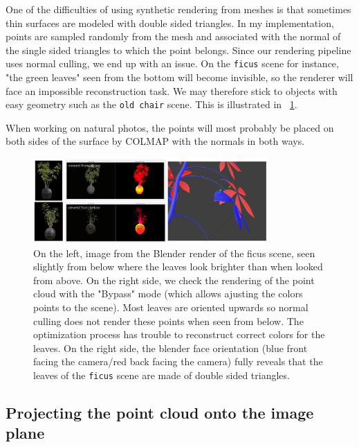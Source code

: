 \noindent One of the difficulties of using synthetic rendering from meshes is that sometimes thin surfaces are modeled with double sided triangles. In my implementation, points are sampled randomly from the mesh and associated with the normal of the single sided triangles to which the point belongs. Since our rendering pipeline uses normal culling, we end up with an issue. On the \texttt{ficus} scene for instance, "the green leaves" seen from the bottom will become invisible, so the renderer will face an impossible reconstruction task. We may therefore stick to objects with easy geometry such as the \texttt{old chair} scene. This is illustrated in ~\cref{fig:ficus_culling_issue}.

\noindent When working on natural photos, the points will most probably be placed on both sides of the surface by COLMAP with the normals in both ways. 


\begin{figure}
    \centering
    \includegraphics[width=0.8\textwidth]{figures/double_sided_surfaces_issues.png}
    \caption{On the left, image from the Blender render of the ficus scene, seen slightly from below where the leaves look brighter than when looked from above. On the right side, we check the rendering of the point cloud with the "Bypass" mode (which allows ajusting the colors points to the scene). Most leaves are oriented upwards so normal culling does not render these points when seen from below. The optimization process has trouble to reconstruct correct colors for the leaves. On the right side, the blender face orientation (blue front facing the camera/red back facing the camera) fully reveals that the leaves of the \texttt{ficus} scene are made of double sided triangles.}
    \label{fig:ficus_culling_issue}
\end{figure}

\subsection{Projecting the point cloud onto the image plane}
\label{sec:projecting_the_point_cloud_onto_the_image_plane}

